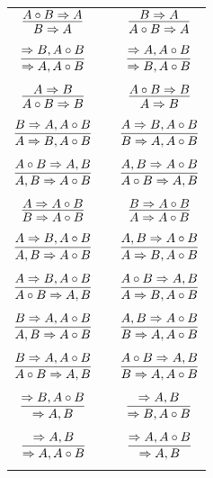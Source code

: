 \documentclass[11pt]{article}
\begin{document}
\begin{center}
\begin{tabular}{ccc}
$\infer{B\Rightarrow A}{A\circ B\Rightarrow A}$ && $\infer{A\circ B\Rightarrow A}{B\Rightarrow A}$ \\
&& \\
$\infer{\Rightarrow A, A\circ B}{\Rightarrow B, A\circ B}$ && $\infer{\Rightarrow B, A\circ B}{\Rightarrow A, A\circ B}$ \\
&& \\
$\infer{A\circ B\Rightarrow B}{A\Rightarrow B}$ && $\infer{A\Rightarrow B}{A\circ B\Rightarrow B}$ \\
&& \\
$\infer{A\Rightarrow B, A\circ B}{B\Rightarrow A, A\circ B}$ && $\infer{B\Rightarrow A, A\circ B}{A\Rightarrow B, A\circ B}$ \\
&& \\
$\infer{A, B\Rightarrow A\circ B}{A\circ B\Rightarrow A, B}$ && $\infer{A\circ B\Rightarrow A, B}{A, B\Rightarrow A\circ B}$ \\
&& \\
$\infer{B\Rightarrow A\circ B}{A\Rightarrow A\circ B}$ && $\infer{A\Rightarrow A\circ B}{B\Rightarrow A\circ B}$ \\
&& \\
$\infer{A, B\Rightarrow A\circ B}{A\Rightarrow B, A\circ B}$ && $\infer{A\Rightarrow B, A\circ B}{A, B\Rightarrow A\circ B}$ \\
&& \\
$\infer{A\circ B\Rightarrow A, B}{A\Rightarrow B, A\circ B}$ && $\infer{A\Rightarrow B, A\circ B}{A\circ B\Rightarrow A, B}$ \\
&& \\
$\infer{A, B\Rightarrow A\circ B}{B\Rightarrow A, A\circ B}$ && $\infer{B\Rightarrow A, A\circ B}{A, B\Rightarrow A\circ B}$ \\
&& \\
$\infer{A\circ B\Rightarrow A, B}{B\Rightarrow A, A\circ B}$ && $\infer{B\Rightarrow A, A\circ B}{A\circ B\Rightarrow A, B}$ \\
&& \\
$\infer{\Rightarrow A, B}{\Rightarrow B, A\circ B}$ && $\infer{\Rightarrow B, A\circ B}{\Rightarrow A, B}$ \\
&& \\
$\infer{\Rightarrow A, A\circ B}{\Rightarrow A, B}$ && $\infer{\Rightarrow A, B}{\Rightarrow A, A\circ B}$ \\
&& \\

\end{tabular}

\end{center}
\end{document}
